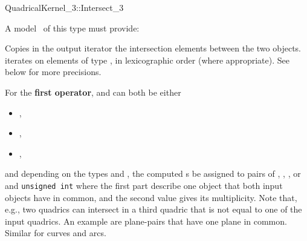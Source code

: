 \begin{ccRefFunctionObjectConcept}{QuadricalKernel_3::Intersect_3}

\ccRefines



A model \ccVar\ of this type must provide:

{Copies in the output iterator the intersection elements between the
two objects.  iterates on
elements of type , in lexicographic order
(where appropriate). See below for more precisions.}


For the \textbf{first operator},  and  can both 
be either

\begin{itemize}
\item {} ,
\item {} ,
\item {} ,
\end{itemize} 

and depending on the types  and , the computed 
s be assigned to pairs of
, , , or 
and {\tt unsigned int} where the first part describe
one object that both input objects have in common, and the second
value gives its multiplicity. Note that, e.g., two quadrics
can intersect in a third quadric that is not equal to one of the input
quadrics. An example are plane-pairs that have one plane in common.
Similar for curves and arcs.

\end{ccRefFunctionObjectConcept}
